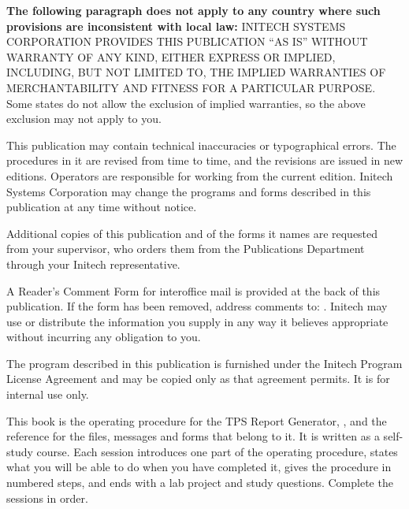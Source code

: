 \begin{TitleVerso}
{\imLegalFont
\textbf{The following paragraph does not apply to any country where such
provisions are inconsistent with local law:} INITECH SYSTEMS CORPORATION
PROVIDES THIS PUBLICATION ``AS IS'' WITHOUT WARRANTY OF ANY KIND, EITHER
EXPRESS OR IMPLIED, INCLUDING, BUT NOT LIMITED TO, THE IMPLIED WARRANTIES OF
MERCHANTABILITY AND FITNESS FOR A PARTICULAR PURPOSE.  Some states do not
allow the exclusion of implied warranties, so the above exclusion may not
apply to you.\par
This publication may contain technical inaccuracies or typographical
errors.  The procedures in it are revised from time to time, and the
revisions are issued in new editions.  Operators are responsible for
working from the current edition.  Initech Systems Corporation may change
the programs and forms described in this publication at any time without
notice.\par
Additional copies of this publication and of the forms it names are
requested from your supervisor, who orders them from the Publications
Department through your Initech representative.\par}

{\footnotesize
A Reader's Comment Form for interoffice mail is provided at the back of
this publication.  If the form has been removed, address comments to:
\InitechAddressLine.
Initech may use or distribute the information you supply in any way it
believes appropriate without incurring any obligation to you.\par
The program described in this publication is furnished under the Initech
Program License Agreement and may be copied only as that agreement
permits.  It is for internal use only.\par}

\end{TitleVerso}

This book is the operating procedure for the TPS Report Generator,
, and the reference for the files, messages and forms that
belong to it.  It is written as a self-study course.  Each session
introduces one part of the operating procedure, states what you will be
able to do when you have completed it, gives the procedure in numbered
steps, and ends with a lab project and study questions.  Complete the
sessions in order.

